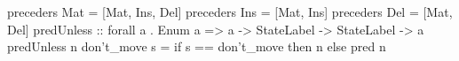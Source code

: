 preceders Mat = [Mat, Ins, Del]
preceders Ins = [Mat, Ins]
preceders Del = [Mat, Del]
predUnless :: forall a . Enum a => a -> StateLabel -> StateLabel -> a
predUnless n don't_move s = if s == don't_move then n else pred n
